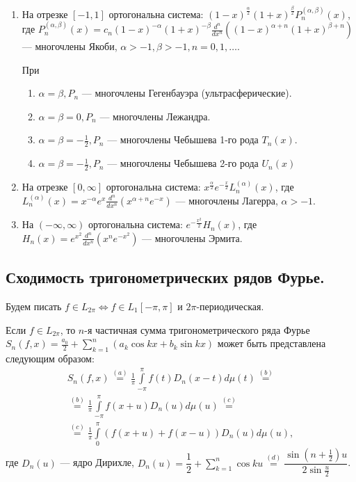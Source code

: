 \begin{enumerate}
	\item На отрезке $[-1,1]$ ортогональна система: $(1-x)^{\frac{\alpha}{2}}(1+x)^{\frac{\beta}{2}}P_n^{(\alpha,\beta)}(x)$,\\где $P_n^{(\alpha,\beta)}(x)=c_n(1-x)^{-\alpha}(1+x)^{-\beta} \frac{d^n}{dx^n}\left((1-x)^{\alpha+n}(1+x)^{\beta+n}\right)$ --- многочлены Якоби, $\alpha>-1, \beta>-1, n=0,1,\ldots$.
	
	При 
	\begin{enumerate}
		\item $\alpha=\beta, P_n$ --- многочлены Гегенбауэра (ультрасферические).
		\item $\alpha=\beta=0, P_n$ --- многочлены Лежандра.
		\item $\alpha=\beta=-\frac{1}{2}, P_n$ --- многочлены Чебышева 1-го рода $T_n(x)$.
		\item $\alpha=\beta=-\frac{1}{2}, P_n$ --- многочлены Чебышева 2-го рода $U_n(x)$
	\end{enumerate}
	\item На отрезке $[0,\infty]$ ортогональна система: $x^{\frac{\alpha}{2}}e^{-\frac{x}{2}}L_n^{(\alpha)}(x)$, где $L_n^{(\alpha)}(x)=x^{-\alpha}e^x\frac{d^n}{dx^n}\left(x^{\alpha+n}e^{-x}\right)$ --- многочлены Лагерра, $\alpha>-1$.
	\item На $(-\infty,\infty)$ ортогональна система: $e^{-\frac{x^2}{2}}H_n(x)$, где $H_n(x)=e^{x^2}\frac{d^n}{dx^n}(x^ne^{-x^2})$ --- многочлены Эрмита.
\end{enumerate}

\subsection{Сходимость тригонометрических рядов Фурье.}

Будем писать $f\in L_{2\pi}\Leftrightarrow f\in L_1[-\pi,\pi]$ и $2\pi$-периодическая. 
\begin{lemma}
	Если \label{lemma_12.2.1}$f\in L_{2\pi}$, то $n$-я частичная сумма тригонометрического ряда Фурье $S_n(f,x)=\frac{a_0}{2}+\sum\limits_{k=1}^n(a_k\cos kx+b_k\sin kx)$ может быть представлена следующим образом:
	\begin{multline*}
		S_n(f,x)\overset{(a)}{=}\frac{1}{\pi}\int\limits_{-\pi}^\pi f(t)D_n(x-t)d\mu(t)\overset{(b)}{=}\\ \overset{(b)}{=}\frac{1}{\pi}\int\limits_{-\pi}^\pi f(x+u)D_n(u)d\mu(u)\overset{(c)}{=}\\ \overset{(c)}{=}\frac{1}{\pi}\int\limits_{0}^\pi(f(x+u)+f(x-u))D_n(u)d\mu(u),
	\end{multline*} 
где $D_n(u)$ --- ядро Дирихле, $D_n(u)=\dfrac{1}{2}+\sum\limits_{k=1}^n \cos ku\overset{(d)}{=}\dfrac{\sin(n+\frac{1}{2})u}{2\sin\frac{u}{2}}$. 
\end{lemma}

